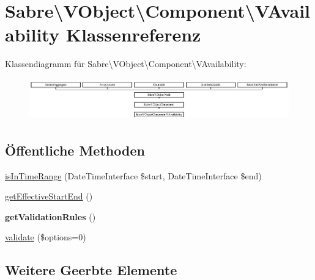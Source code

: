 \hypertarget{class_sabre_1_1_v_object_1_1_component_1_1_v_availability}{}\section{Sabre\textbackslash{}V\+Object\textbackslash{}Component\textbackslash{}V\+Availability Klassenreferenz}
\label{class_sabre_1_1_v_object_1_1_component_1_1_v_availability}
Klassendiagramm für Sabre\textbackslash{}V\+Object\textbackslash{}Component\textbackslash{}V\+Availability\+:\begin{figure}[H]
\begin{center}
\leavevmode
\includegraphics[height=1.821138cm]{class_sabre_1_1_v_object_1_1_component_1_1_v_availability}
\end{center}
\end{figure}
\subsection*{Öffentliche Methoden}
\begin{DoxyCompactItemize}
\item 
\mbox{\hyperlink{class_sabre_1_1_v_object_1_1_component_1_1_v_availability_af994884bd69ac671bbf666bc9a0db244}{is\+In\+Time\+Range}} (Date\+Time\+Interface \$start, Date\+Time\+Interface \$end)
\item 
\mbox{\hyperlink{class_sabre_1_1_v_object_1_1_component_1_1_v_availability_a384bdfff5e98c7a686f55a6202fa898e}{get\+Effective\+Start\+End}} ()
\item 
\mbox{\label{class_sabre_1_1_v_object_1_1_component_1_1_v_availability_ab367fe28937534308f43ef5f6185be8e}} 
{\bfseries get\+Validation\+Rules} ()
\item 
\mbox{\hyperlink{class_sabre_1_1_v_object_1_1_component_1_1_v_availability_abea895824302a99c9e11b9ce39080ca3}{validate}} (\$options=0)
\end{DoxyCompactItemize}
\subsection*{Weitere Geerbte Elemente}


